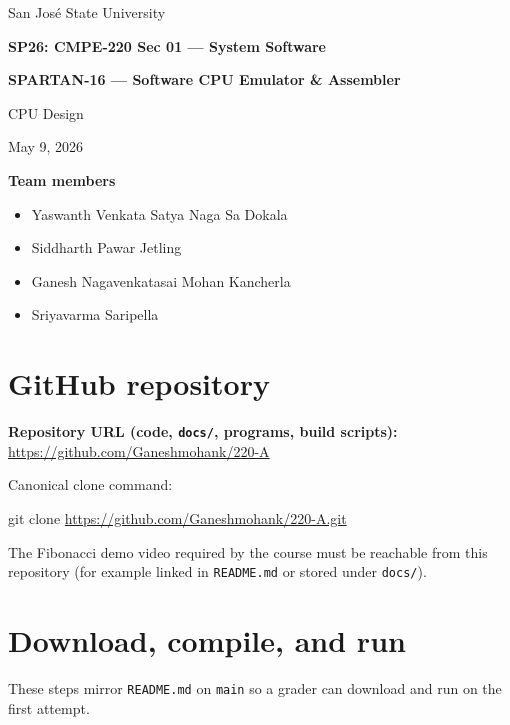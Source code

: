 \documentclass[12pt]{article}
\newcommand{\UniversityLine}{San Jos\'{e} State University}
\newcommand{\CourseNumberName}{SP26: CMPE-220 Sec 01 --- System Software}
\newcommand{\ProjectTitle}{SPARTAN-16 --- Software CPU Emulator \& Assembler}
\newcommand{\AssignmentTitle}{CPU Design}
\newcommand{\SubmissionDate}{May 9, 2026}
\newcommand{\GitHubURL}{https://github.com/Ganeshmohank/220-A}
\newcommand{\GitHubCloneURL}{https://github.com/Ganeshmohank/220-A.git}
\newcommand{\TeamMemberOne}{Yaswanth Venkata Satya Naga Sa Dokala}
\newcommand{\TeamMemberTwo}{Siddharth Pawar Jetling}
\newcommand{\TeamMemberThree}{Ganesh Nagavenkatasai Mohan Kancherla}
\newcommand{\TeamMemberFour}{Sriyavarma Saripella}
\begin{document}
\begin{titlepage}
  \centering
  \vspace*{0.95in}
  {\large \UniversityLine\par}
  \vspace{0.35in}
  {\Large\bfseries \CourseNumberName\par}
  \vspace{0.45in}
  {\LARGE\bfseries \ProjectTitle\par}
  \vspace{0.22in}
  {\large \AssignmentTitle\par}
  \vspace{0.28in}
  {\large \SubmissionDate\par}
  \vfill
  \begin{flushleft}
    \large\textbf{Team members}\\[0.4em]
    \begin{itemize}\setlength\itemsep{0.18em}
      \item \TeamMemberOne
      \item \TeamMemberTwo
      \item \TeamMemberThree
      \item \TeamMemberFour
    \end{itemize}
  \end{flushleft}
  \vspace{0.5in}
\end{titlepage}
\thispagestyle{empty}
\clearpage

\setcounter{page}{1}
\pagestyle{plain}
\doublespacing

\section*{GitHub repository}
\noindent\textbf{Repository URL (code, \texttt{docs/}, programs, build scripts):}\\[0.55em]
{\large\url{\GitHubURL}}

\noindent Canonical clone command:
\begin{center}
  \ttfamily git clone \url{\GitHubCloneURL}
\end{center}

\noindent The Fibonacci demo video required by the course must be reachable from this repository (for example linked in \texttt{README.md} or stored under \texttt{docs/}).
\vfill
\clearpage

\section*{Download, compile, and run}
\noindent These steps mirror \texttt{README.md} on \texttt{main} so a grader can download and run on the first attempt.
\end{document}
